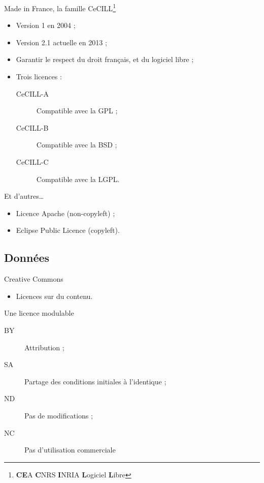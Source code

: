 \begin{frame}{Made in France, la famille CeCILL\footnote{\textbf{CE}A \textbf{C}NRS \textbf{I}NRIA \textbf{L}ogiciel \textbf{L}ibre}}
  \begin{itemize}
    \item Version 1 en 2004 ;
    \item Version 2.1 actuelle en 2013 ;
    \item Garantir le respect du droit français, et du logiciel libre ;
    \item Trois licences :
    \begin{description}
      \item[CeCILL-A] Compatible avec la GPL ;
      \item[CeCILL-B] Compatible avec la BSD ;
      \item[CeCILL-C] Compatible avec la LGPL.
    \end{description}
  \end{itemize}
\end{frame}

\begin{frame}{Et d'autres\dots}
  \begin{itemize}
    \item Licence Apache (non-copyleft) ;
    \item Eclipse Public Licence (copyleft).
  \end{itemize}
\end{frame}

\subsection{Données}

\begin{frame}{Creative Commons}
  \begin{itemize}
    \item Licences sur du contenu.
  \end{itemize}
  
  \begin{block}{Une licence modulable}
    \begin{description}
      \item[BY] Attribution ;
      \item[SA] Partage des conditions initiales à l'identique ;
      \item[ND] Pas de modifications ;
      \item[NC] Pas d'utilisation commerciale
    \end{description}
  \end{block}
  
  \begin{center}
  \end{center}
\end{frame}

